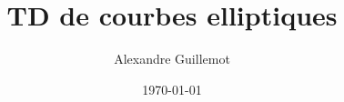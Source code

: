 \documentclass[11pt]{report}
\begin{document}
\title{TD de courbes elliptiques}
\date{\today}
\author{Alexandre Guillemot}
\maketitle

\tableofcontents

\pagestyle{fancy}
\fancyhf{}
\lhead{\leftmark}
\cfoot{\thepage}


\end{document}

